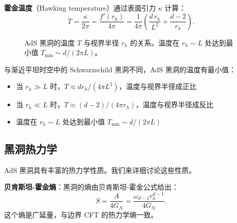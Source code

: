 \textbf{霍金温度}（Hawking temperature）通过表面引力 $\kappa$ 计算：
\begin{equation}
    T = \frac{\kappa}{2\pi} = \frac{f'(r_h)}{4\pi} = \frac{1}{4\pi} \left( \frac{d \, r_h}{L^2} + \frac{d-2}{r_h} \right).
    \label{eq:Hawking_T}
\end{equation}

\begin{figure}[htbp]
\centering
{}
\caption{AdS 黑洞的温度 $T$ 与视界半径 $r_h$ 的关系。温度在 $r_h \sim L$ 处达到最小值 $T_{\min} \sim d/(2\pi L)$。}
\label{fig:AdS_BH_T}
\end{figure}

\begin{property}
与渐近平坦时空中的 Schwarzschild 黑洞不同，AdS 黑洞的温度有最小值：
\begin{itemize}
    \item 当 $r_h \gg L$ 时，$T \approx d r_h/(4\pi L^2)$，温度与视界半径成正比
    \item 当 $r_h \ll L$ 时，$T \approx (d-2)/(4\pi r_h)$，温度与视界半径成反比
    \item 温度在 $r_h \sim L$ 处达到最小值 $T_{\min} \sim d/(2\pi L)$
\end{itemize}
\end{property}

\subsection{黑洞热力学}

AdS 黑洞具有丰富的热力学性质。我们来详细讨论这些性质。

\textbf{贝肯斯坦-霍金熵}：黑洞的熵由贝肯斯坦-霍金公式给出：
\begin{equation}
    S = \frac{A}{4G_N} = \frac{\omega_{d-1} r_h^{d-1}}{4G_N}.
\end{equation}
这个熵是广延量，与边界 CFT 的热力学熵一致。

